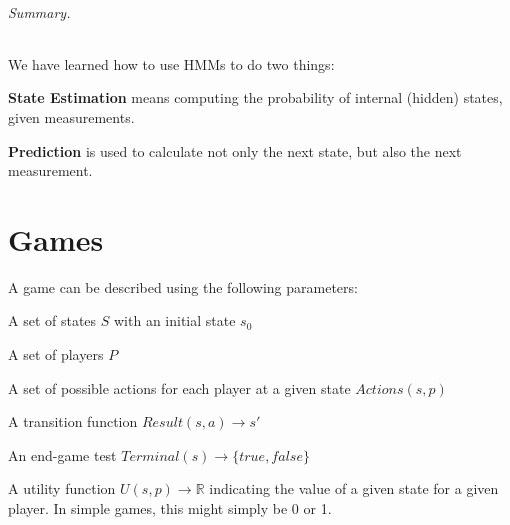 \documentclass[10pt,a4paper]{article}
\newenvironment{itemize_packed}{
\begin{itemize}
\setlength{\itemsep}{0pt}
\setlength{\parskip}{0pt}
}{\end{itemize}}
\begin{document}
\paragraph{Summary.} We have learned how to use HMMs to do two things:
\begin{itemize_packed}
\item \textbf{State Estimation} means computing the probability of internal (hidden) states, given measurements.
\item \textbf{Prediction} is used to calculate not only the next state, but also the next measurement.
\end{itemize_packed}


\part{Games}

A game can be described using the following parameters:
\begin{itemize_packed}
\item A set of states $S$ with an initial state $s_0$
\item A set of players $P$
\item A set of possible actions for each player at a given state $Actions(s,p)$
\item A transition function $Result(s,a)\rightarrow s'$
\item An end-game test $Terminal(s)\rightarrow \{true, false\}$
\item A utility function $U(s,p)\rightarrow \mathbb{R}$ indicating the value of a given state for a given player. In simple games, this might simply be 0 or 1.
\end{itemize_packed}
\end{document}
